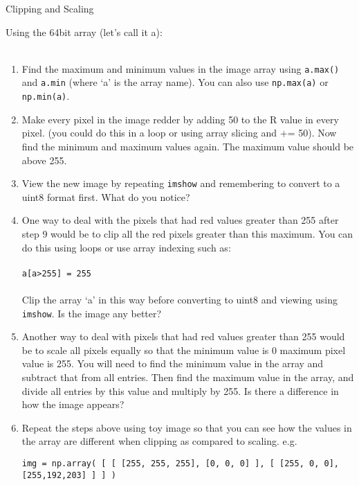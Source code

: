 \documentclass{lab}
\begin{document}
\begin{task}{Clipping and Scaling}{}

Using the 64bit array (let’s call it a):  \\~

\begin{enumerate}
\item Find the maximum and minimum values in the image array using \texttt{a.max()} and \texttt{a.min} (where ‘a’ is the array name). You can also use \texttt{np.max(a)} or \texttt{np.min(a)}.
\item Make every pixel in the image redder by adding 50 to the R value in every pixel. (you could do this in a loop or using array slicing and += 50). Now find the minimum and maximum values again. The maximum value should be above 255.
\item View the new image by repeating \texttt{imshow} and remembering to convert to a uint8 format first. What do you notice?
\item One way to deal with the pixels that had red values greater than 255 after step 9 would be to clip all the red pixels greater than this maximum. You can do this using loops or use array indexing such as:
\\~\\ \texttt{a[a>255] = 255}\\~\\
Clip the array ‘a’ in this way before converting to uint8 and viewing using \texttt{imshow}. Is the image any better?
\item Another way to deal with pixels that had red values greater than 255 would be to scale all pixels equally so that the minimum value is 0 maximum pixel value is 255. You will need to find the minimum value in the array and subtract that from all entries. Then find the maximum value in the array, and divide all entries by this value and multiply by 255. 
Is there a difference in how the image appears?
\item Repeat the steps above using toy image so that you can see how the values in the array are different when clipping as compared to scaling. e.g.

\begin{lstlisting}[style=myPython] 
img = np.array( [ [ [255, 255, 255], [0, 0, 0] ], [ [255, 0, 0],  [255,192,203] ] ] ) 
\end{lstlisting}



\end{enumerate}

\end{task}
\end{document}
